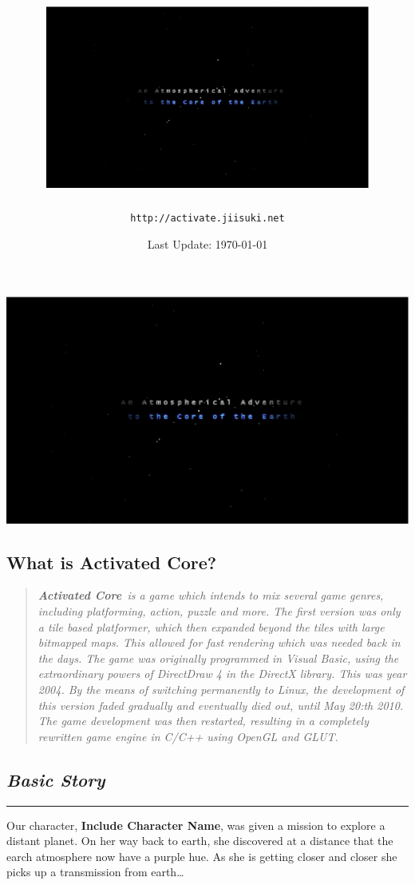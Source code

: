 \documentclass[a5paper, 10pt, titlepage, landscape, twoside, final]{article}
\title{
  \includegraphics[height=6cm]{devintro.eps} \\
}
\author{\texttt{\small http://activate.jiisuki.net}}
\date{\footnotesize Last Update: \today}
\newcommand{\ac}{\textbf{Activated Core}}
\newcommand{\cn}{\textbf{Include Character Name}}
\begin{document}

\begin{center}
\includegraphics[width=17cm]{devintro.eps}
\end{center}

\clearpage
\tableofcontents

\clearpage
\begin{center}
\section{What is \ac?}
\end{center}
%
\begin{quote}
  \large{\textit{\ac\ is a game which intends to mix several game genres, including platforming, action, puzzle and more. The first version was only a tile based platformer, which then expanded beyond the tiles with large bitmapped maps. This allowed for fast rendering which was needed back in the days. The game was originally programmed in Visual Basic, using the extraordinary powers of DirectDraw 4 in the DirectX library. This was year 2004. By the means of switching permanently to Linux, the development of this version faded gradually and eventually died out, until May 20:th 2010. The game development was then restarted, resulting in a completely rewritten game engine in C/C++ using OpenGL and GLUT.}}
\end{quote}

\begin{center}
\subsection{\textit{Basic Story}}
\end{center}
\hrule\par
%
Our character, \cn, was given a mission to explore a distant planet. On her way back to earth, she discovered at a distance that the earch atmosphere now have a purple hue. As she is getting closer and closer she picks up a transmission from earth\ldots
\end{document}
